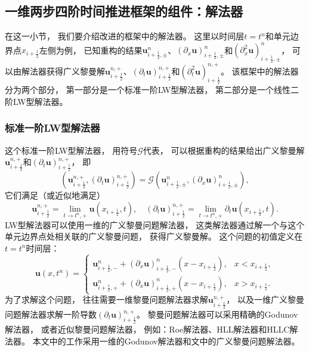 \subsection{一维两步四阶时间推进框架的组件：解法器}
\label{sec:1D-Solver}

在这一小节，
我们要介绍改进的框架中的解法器。
这里以时间层$t=t^n$和单元边界点$x_{i+\frac{1}{2}}$左侧为例，
已知重构的结果${\bm{u}}_{i+\frac{1}{2},\pm}^n$、$\left({\partial_{x}}{\bm{u}}\right)_{i+\frac{1}{2},\pm}^n$和$\left({\partial_{x}^2}{\bm{u}}\right)_{i+\frac{1}{2},\pm}^n$，
可以由解法器获得广义黎曼解${\bm{u}}_{i+\frac{1}{2}}^{n, +}$、$\left({\partial_{t}}{\bm{u}}\right)_{i+\frac{1}{2}}^{n, +}$和$\left({\partial_{t}^2}{\bm{u}}\right)_{i+\frac{1}{2}}^{n, +}$。
该框架中的解法器分为两个部分，
第一部分是一个标准一阶LW型解法器，
第二部分是一个线性二阶LW型解法器。

\subsubsection{标准一阶LW型解法器}

这个标准一阶LW型解法器，
用符号$\mathcal{G}$代表，
可以根据重构的结果给出广义黎曼解${\bm{u}}_{i+\frac{1}{2}}^{n, +}$和$\left({\partial_{t}}{\bm{u}}\right)_{i+\frac{1}{2}}^{n, +}$，
即
\begin{equation}
  \label{eq:1D-solver}
  \left({\bm{u}}_{i+\frac{1}{2}}^{n,+}, \left({\partial_{t}}{\bm{u}}\right)_{i+\frac{1}{2}}^{n,+}\right) = \mathcal{G}\left({\bm{u}}_{i+\frac{1}{2},\pm}^n, \left({\partial_{x}}{\bm{u}}\right)_{i+\frac{1}{2},\pm}^n\right),
\end{equation}
它们满足（或近似地满足）
\begin{equation}
  {\bm{u}}_{i+\frac{1}{2}}^{n,+} = \lim_{t\to t^n,+} {\bm{u}}(x_{i+\frac{1}{2}},t), \quad
  \left({\partial_{t}}{\bm{u}}\right)_{i+\frac{1}{2}}^{n,+} = \lim_{t\to t^n,+} {\partial_{t}}{\bm{u}}(x_{i+\frac{1}{2}},t).
\end{equation}
LW型解法器可以使用一维的广义黎曼问题解法器，
这类解法器通过解一个与这个单元边界点处相关联的广义黎曼问题，
获得广义黎曼解。
这个问题的初值定义在$t=t^n$时间层：
\begin{equation}
  {\bm{u}}(x,t^n) =
  \begin{cases}
    {\bm{u}}_{i+\frac{1}{2},-}^n + \left({\partial_{x}}{\bm{u}}\right)_{i+\frac{1}{2},-}^n (x-x_{i+\frac{1}{2}}), & x<x_{i+\frac{1}{2}},  \\
    {\bm{u}}_{i+\frac{1}{2},+}^n + \left({\partial_{x}}{\bm{u}}\right)_{i+\frac{1}{2},+}^n (x-x_{i+\frac{1}{2}}), & x>x_{i+\frac{1}{2}}.
  \end{cases}
\end{equation}
为了求解这个问题，
往往需要一维黎曼问题解法器求解${\bm u}_{i+\frac{1}{2}}^{n,+}$，
以及一维广义黎曼问题解法器求解一阶导数$\left({\partial_t}{\bm u}\right)_{i+\frac{1}{2}}^{n,+}$。
黎曼问题解法器可以采用精确的Godunov解法器，
或者近似黎曼问题解法器，
例如：Roe解法器、HLL解法器和HLLC解法器。
本文中的工作采用一维的Godunov解法器和文\cite{GRP}中的广义黎曼问题解法器。

